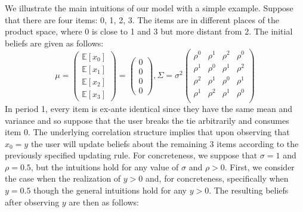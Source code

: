 \documentclass[format=acmsmall, review=false]{acmart}
\newcommand{\xhdr}[1]{\vspace{1mm} \noindent{\bf #1}}
\begin{document}
\xhdr{An Illustrative Example} We illustrate the main intuitions of our model with a simple example. Suppose that there are four items: 0, 1, 2, 3. The items are in different places of the product space, where 0 is close to 1 and 3 but more distant from 2. The initial beliefs are given as follows:
\[ \mu = \left (\begin{array}{c}
\mathbb{E}[x_0] \\
\mathbb{E}[x_1] \\
\mathbb{E}[x_2] \\
\mathbb{E}[x_3]
\end{array}  \right) = \left (\begin{array}{c}
0 \\
0\\
0 \\
0
\end{array}  \right), \Sigma =  \sigma^{2} \left( \begin{array}{cccc}
\rho^{0} & \rho^{1} & \rho^{2} & \rho^{0} \\
\rho^{1} & \rho^{0} & \rho^{1} & \rho^{2} \\
\rho^{2} & \rho^{1} & \rho^{0} & \rho^{1} \\
\rho^{1} & \rho^{2} & \rho^{1} & \rho^{0} \\
\end{array} \right)
\]
In period 1, every item is ex-ante identical since they have the same mean and variance and so suppose that the user breaks the tie arbitrarily and consumes item 0. The underlying correlation structure implies that upon observing that $x_0=y$ the user will update beliefs about the remaining 3 items according to the previously specified updating rule. For concreteness, we suppose that $\sigma = 1$ and $\rho = 0.5$, but the intuitions hold for any value of $\sigma$ and $\rho > 0$. First, we consider the case when the realization of $y > 0$ and, for concreteness, specifically when $y = 0.5$ though the general intuitions hold for any $y > 0$. The resulting beliefs after observing $y$ are then as follows:
\end{document}
